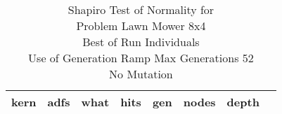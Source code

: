 \begin{table}[H]
\caption{Shapiro Test of Normality for \\ Problem  Lawn Mower 8x4\\Best of Run Individuals \\ Use of Generation Ramp  Max Generations 52\\ No Mutation \\}
\begin{center}
\scalebox{0.8} %
{
\begin{tabular}{lrrrrrrr}
\hline
kern & adfs & what & hits & gen & nodes & depth \\
\hline


\end{tabular}
}
\end{center}
\end{table}

